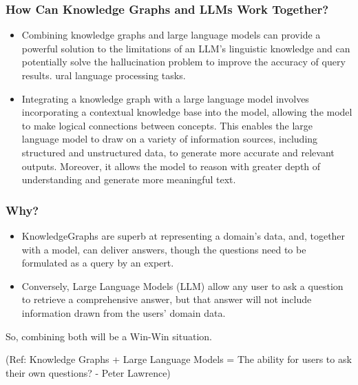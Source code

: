 \begin{frame}[fragile]\frametitle{How Can Knowledge Graphs and LLMs Work Together?}

\begin{itemize}
\item Combining knowledge graphs and large language models can provide a powerful solution to the limitations of an LLM's linguistic knowledge and can potentially solve the hallucination problem to improve the accuracy of query results. ural language processing tasks.
\item Integrating a knowledge graph with a large language model involves incorporating a contextual knowledge base into the model, allowing the model to make logical connections between concepts. This enables the large language model to draw on a variety of information sources, including structured and unstructured data, to generate more accurate and relevant outputs. Moreover, it allows the model to reason with greater depth of understanding and generate more meaningful text.
\end{itemize}

\end{frame}

\begin{frame}[fragile]\frametitle{Why?}

\begin{itemize}
\item KnowledgeGraphs are superb at representing a domain’s data, and, together with a model, can deliver answers, though the questions need to be formulated as a query by an expert.
\item Conversely, Large Language Models (LLM) allow any user to ask a question to retrieve a comprehensive answer, but that answer will not include information drawn from the users’ domain data.
\end{itemize}
	
So, combining both will be a Win-Win situation.

{\tiny (Ref: Knowledge Graphs + Large Language Models = The ability for users to ask their own questions? - Peter Lawrence)}

\end{frame}

